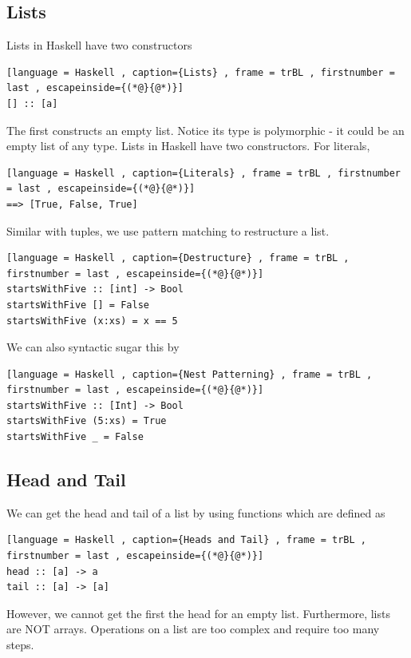 \documentclass[a4paper]{article}
\theoremstyle{plain}
\theoremstyle{definition}
\theoremstyle{remark}
\begin{document}
\subsection{Lists}
Lists in Haskell have two constructors
\begin{lstlisting}[language = Haskell , caption={Lists} , frame = trBL , firstnumber = last , escapeinside={(*@}{@*)}]
[] :: [a]
\end{lstlisting}
The first constructs an empty list. Notice its type is polymorphic - it could be an empty list of any type. 
Lists in Haskell have two constructors. For literals,
\begin{lstlisting}[language = Haskell , caption={Literals} , frame = trBL , firstnumber = last , escapeinside={(*@}{@*)}]
==> [True, False, True]
\end{lstlisting}
Similar with tuples, we use pattern matching to restructure a list.
\begin{lstlisting}[language = Haskell , caption={Destructure} , frame = trBL , firstnumber = last , escapeinside={(*@}{@*)}]
startsWithFive :: [int] -> Bool
startsWithFive [] = False
startsWithFive (x:xs) = x == 5
\end{lstlisting}
We can also syntactic sugar this by
\begin{lstlisting}[language = Haskell , caption={Nest Patterning} , frame = trBL , firstnumber = last , escapeinside={(*@}{@*)}]
startsWithFive :: [Int] -> Bool
startsWithFive (5:xs) = True
startsWithFive _ = False
\end{lstlisting}
\subsection{Head and Tail}
We can get the head and tail of a list by using functions which are defined as
\begin{lstlisting}[language = Haskell , caption={Heads and Tail} , frame = trBL , firstnumber = last , escapeinside={(*@}{@*)}]
head :: [a] -> a
tail :: [a] -> [a]
\end{lstlisting}
However, we cannot get the first the head for an empty list. Furthermore, lists are NOT arrays. Operations on a list are too complex and require too many steps. 
\end{document}
